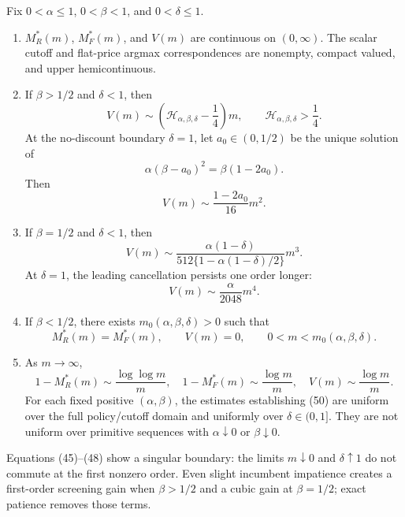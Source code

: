 \documentclass[mnsc,blindrev]{informs3}
\begin{document}
\begin{theorem}
\label{thm:thickness}
Fix $0<\alpha\le1$, $0<\beta<1$, and $0<\delta\le1$.
\begin{enumerate}[label=(\roman*)]
 \item $M_R^*(m)$, $M_F^*(m)$, and $V(m)$ are continuous on
 $(0,\infty)$.  The scalar
 cutoff and flat-price argmax correspondences are nonempty, compact valued,
 and upper hemicontinuous.

 \item If $\beta>1/2$ and $\delta<1$, then
 \[
  V(m)
  \sim\left(\mathcal H_{\alpha,\beta,\delta}-\frac14\right)m,
  \qquad \mathcal H_{\alpha,\beta,\delta}>\frac14.        \tag{45}
 \]
 At the no-discount boundary $\delta=1$, let $a_0\in(0,1/2)$ be the
 unique solution of
 \[
  \alpha(\beta-a_0)^2=\beta(1-2a_0).
 \]
 Then
 \[
  V(m)\sim\frac{1-2a_0}{16}m^2.                           \tag{46}
 \]

 \item If $\beta=1/2$ and $\delta<1$, then
 \[
  V(m)
  \sim
  \frac{\alpha(1-\delta)}
  {512\{1-\alpha(1-\delta)/2\}}m^3.                       \tag{47}
 \]
 At $\delta=1$, the leading cancellation persists one order longer:
 \[
  V(m)\sim\frac{\alpha}{2048}m^4.                         \tag{48}
 \]

 \item If $\beta<1/2$, there exists
 $m_0(\alpha,\beta,\delta)>0$ such that
 \[
  M_R^*(m)=M_F^*(m),\qquad
  V(m)=0,
  \qquad 0<m<m_0(\alpha,\beta,\delta).                   \tag{49}
 \]

 \item As $m\to\infty$,
 \[
  1-M_R^*(m)\sim\frac{\log\log m}{m},
  \quad 1-M_F^*(m)\sim\frac{\log m}{m},
  \quad V(m)\sim\frac{\log m}{m}.                        \tag{50}
 \]
 For each fixed positive $(\alpha,\beta)$, the estimates establishing (50)
 are uniform over the full policy/cutoff domain and uniformly over
 $\delta\in(0,1]$.  They are not uniform over primitive sequences with
 $\alpha\downarrow0$ or $\beta\downarrow0$.
\end{enumerate}
\end{theorem}

Equations (45)--(48) show a singular boundary: the limits $m\downarrow0$ and
$\delta\uparrow1$ do not commute at the first nonzero order.  Even slight
incumbent impatience creates a first-order screening gain when $\beta>1/2$
and a cubic gain at $\beta=1/2$; exact patience removes those terms.
\end{document}
